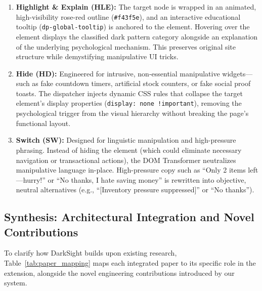 \documentclass[11pt,a4paper]{article}
\begin{document}
\begin{enumerate}[leftmargin=*]
    \item \textbf{Highlight \& Explain (HLE):} The target node is wrapped in an animated, high-visibility rose-red outline (\texttt{\#f43f5e}), and an interactive educational tooltip (\texttt{dp-global-tooltip}) is anchored to the element. Hovering over the element displays the classified dark pattern category alongside an explanation of the underlying psychological mechanism. This preserves original site structure while demystifying manipulative UI tricks.

    \item \textbf{Hide (HD):} Engineered for intrusive, non-essential manipulative widgets—such as fake countdown timers, artificial stock counters, or fake social proof toasts. The dispatcher injects dynamic CSS rules that collapse the target element's display properties (\texttt{display: none !important}), removing the psychological trigger from the visual hierarchy without breaking the page's functional layout.

    \item \textbf{Switch (SW):} Designed for linguistic manipulation and high-pressure phrasing. Instead of hiding the element (which could eliminate necessary navigation or transactional actions), the DOM Transformer neutralizes manipulative language in-place. High-pressure copy such as ``Only 2 items left---hurry!'' or ``No thanks, I hate saving money'' is rewritten into objective, neutral alternatives (e.g., ``[Inventory pressure suppressed]'' or ``No thanks'').
\end{enumerate}

\subsection{Synthesis: Architectural Integration and Novel Contributions}
\label{subsec:synthesis}

To clarify how DarkSight builds upon existing research, Table~\ref{tab:paper_mapping} maps each integrated paper to its specific role in the extension, alongside the novel engineering contributions introduced by our system.
\end{document}
